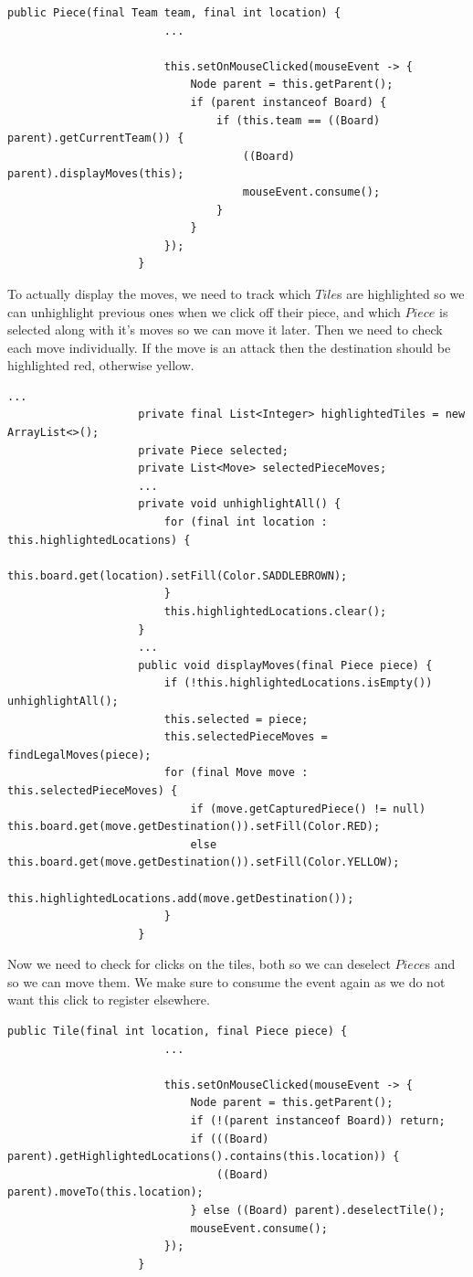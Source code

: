 \documentclass[a4paper]{report}
\begin{document}
				
				\begin{lstlisting}[gobble=20, frame=top, caption=Piece.java]
					public Piece(final Team team, final int location) {
						...
						
						this.setOnMouseClicked(mouseEvent -> {
							Node parent = this.getParent();
							if (parent instanceof Board) {
								if (this.team == ((Board) parent).getCurrentTeam()) {
									((Board) parent).displayMoves(this);
									mouseEvent.consume();
								}
							}
						});
					}
				\end{lstlisting}
				
				\pagebreak
				
				To actually display the moves, we need to track which $Tile$s are highlighted so we can unhighlight previous ones when we click off their piece, and which $Piece$ is selected along with it's moves so we can move it later. Then we need to check each move individually. If the move is an attack then the destination should be highlighted red, otherwise yellow.
				
				\begin{lstlisting}[gobble=20, frame=top, caption=Board.java]
					...
					private final List<Integer> highlightedTiles = new ArrayList<>();
					private Piece selected;
					private List<Move> selectedPieceMoves;
					...
					private void unhighlightAll() {
						for (final int location : this.highlightedLocations) {
							this.board.get(location).setFill(Color.SADDLEBROWN);
						}
						this.highlightedLocations.clear();
					}
					...
					public void displayMoves(final Piece piece) {
						if (!this.highlightedLocations.isEmpty())  unhighlightAll();
						this.selected = piece;
						this.selectedPieceMoves = findLegalMoves(piece);
						for (final Move move : this.selectedPieceMoves) {
							if (move.getCapturedPiece() != null) this.board.get(move.getDestination()).setFill(Color.RED);
							else this.board.get(move.getDestination()).setFill(Color.YELLOW);
							this.highlightedLocations.add(move.getDestination());
						}
					}
				\end{lstlisting} \bigskip
				
				Now we need to check for clicks on the tiles, both so we can deselect $Piece$s and so we can move them. We make sure to consume the event again as we do not want this click to register elsewhere.
				
				\begin{lstlisting}[gobble=20, frame=top, caption=Tile.java]
					public Tile(final int location, final Piece piece) {
						...
						
						this.setOnMouseClicked(mouseEvent -> {
							Node parent = this.getParent();
							if (!(parent instanceof Board)) return;
							if (((Board) parent).getHighlightedLocations().contains(this.location)) {
								((Board) parent).moveTo(this.location);
							} else ((Board) parent).deselectTile();
							mouseEvent.consume();
						});
					}
				\end{lstlisting} \bigskip
				
\end{document}
